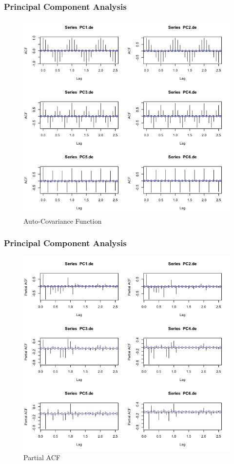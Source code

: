 \documentclass{beamer}
\begin{document}
\begin{frame}
\frametitle{Principal Component Analysis}
\begin{figure}
	\centering
	\includegraphics[width=0.7\linewidth]{../img/PCAde_ACF}
	\caption{Auto-Covariance Function}
	\label{fig:pcadeacf}
\end{figure}
\end{frame}

\begin{frame}
\frametitle{Principal Component Analysis}
\begin{figure}
	\centering
	\includegraphics[width=0.7\linewidth]{../img/PCAde_pacf}
	\caption{Partial ACF}
	\label{fig:pcadpeacf}
\end{figure}
\end{frame}
\end{document}
